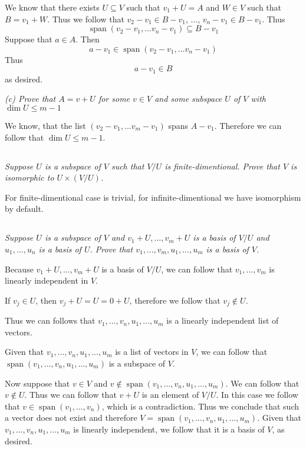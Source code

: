 \documentclass[11pt,oneside,titlepage]{book}
\DeclareMathOperator \Span {span}
\begin{document}
We know that there exists $U \subseteq V$ such that $v_1 + U = A$ and $W \in V$ such
that $B = v_1 + W$.
Thus we follow that $v_2 - v_1 \in B - v_1$, ..., $v_n - v_1 \in B - v_1$. Thus
$$\Span(v_2 - v_1, ... v_n - v_1) \subseteq B - v_1$$
Suppose that $a \in A$. Then
$$a - v_1 \in \Span(v_2 - v_1, ... v_n - v_1)$$
Thus
$$a - v_1 \in B$$
as desired.

\textit{(c) Prove that $A = v + U$ for some $v \in V$ and some subspace $U$ of $V$
  with $\dim U \leq m - 1$}

We know, that the list $(v_2 - v_1, ... v_m - v_1)$ spans $A - v_1$. Therefore we can follow
that $\dim U \leq m - 1$.

\subsection{}

\textit{Suppose $U$ is a subspace of $V$ such that $V/U$ is finite-dimentional. Prove that
  $V$ is isomorphic to $U \times (V / U)$.}

For finite-dimentional case is trivial, for infinite-dimentional we have isomorphism by default.

\subsection{}

\textit{Suppose $U$ is a subspace of $V$ and $v_1 + U, ..., v_m + U$ is a basis of $V/U$
  and $u_1, ..., u_n$ is a basis of $U$. Prove that $v_1, ..., v_m, u_1, ..., u_m$ is a basis
  of $V$.}

Because $v_1 + U, ..., v_m + U$ is a basis of $V/U$, we can follow that $v_1, ..., v_m$ is
linearly independent in $V$.

If $v_j \in U$, then $v_j + U = U = 0 + U$, therefore we follow that $v_j \notin U$.

Thus we can follows that $v_1, ..., v_n, u_1, ..., u_m$ is a linearly independent list of
vectors.

Given that $v_1, ..., v_n, u_1, ..., u_m$ is a list of vectors in $V$, we can follow that
$\Span(v_1, ..., v_n, u_1, ..., u_m)$ is a subspace of $V$.

Now suppose that $v \in V$ and $v \notin \Span(v_1, ..., v_n, u_1, ..., u_m)$. We can follow that
$v \notin U$. Thus we can follow that $v + U$ is an element of $V/U$. In this case we
follow that $v \in \Span(v_1, ..., v_n)$, which is a contradiction. Thus we conclude that
such a vector does not exist and therefore $V = \Span(v_1, ..., v_n, u_1, ..., u_m)$.
Given that $v_1, ..., v_n, u_1, ..., u_m$ is linearly independent, we follow that
it is a basis of $V$, as desired.
\end{document}
